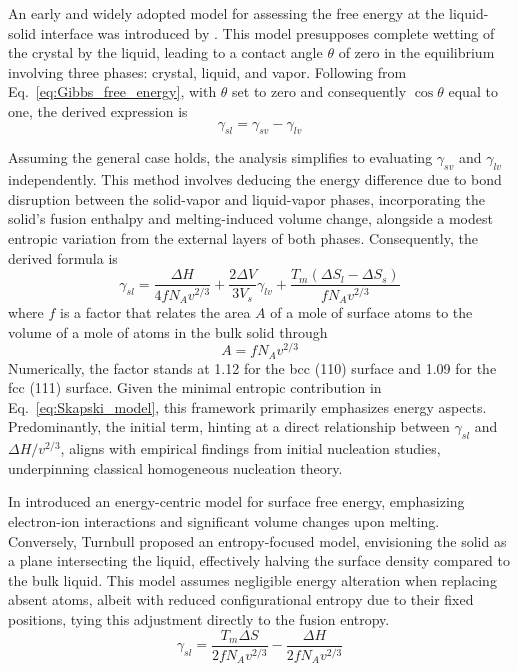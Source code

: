 An early and widely adopted model for assessing the free energy at the liquid-solid interface was introduced by \cite{Skapski1956ATO}. This model 
presupposes complete wetting of the crystal by the liquid, leading to a contact angle $\theta$ of zero in the equilibrium involving three phases: 
crystal, liquid, and vapor. Following from Eq.~\ref{eq:Gibbs_free_energy}, with $\theta$ set to zero and consequently $\cos \theta$ equal to one, the derived expression is
\begin{equation} \label{eq:Skapski_model}
\gamma_{sl} = \gamma_{sv} - \gamma_{lv}
\end{equation}

Assuming the general case holds, the analysis simplifies to evaluating $\gamma_{sv}$ and $\gamma_{lv}$ independently. This method involves deducing the 
energy difference due to bond disruption between the solid-vapor and liquid-vapor phases, incorporating the solid's fusion enthalpy and melting-induced volume 
change, alongside a modest entropic variation from the external layers of both phases. Consequently, the derived formula is
\begin{equation} \label{eq:Skapski_result}
\gamma_{sl} = \frac{\Delta H}{4f N_{A} v^{2/3}} + \frac{2\Delta V}{3V_{s}} \gamma_{lv} + \frac{T_m (\Delta S_l - \Delta S_s)}{f N_{A} v^{2/3}}
\end{equation}
where $f$ is a factor that relates the area $A$ of a mole of surface atoms to the volume of a mole of atoms in the bulk solid through
\begin{equation} \label{eq:relation_factor}
A = f N_{A} v^{2/3}
\end{equation}
Numerically, the factor stands at 1.12 for the bcc (110) surface and 1.09 for the fcc (111) surface. Given the 
minimal entropic contribution in Eq.~\ref{eq:Skapski_model}, this framework primarily emphasizes energy aspects. 
Predominantly, the initial term, hinting at a direct relationship between $\gamma_{sl}$ and $\Delta H/v^{2/3}$, 
aligns with empirical findings from initial nucleation studies, underpinning classical homogeneous nucleation theory.

In \cite{Zadumkin1966SurfaceEA} introduced an energy-centric model for surface free energy, emphasizing electron-ion interactions and 
significant volume changes upon melting. Conversely, Turnbull proposed an entropy-focused model, envisioning the solid as a plane 
intersecting the liquid, effectively halving the surface density compared to the bulk liquid. This model assumes negligible energy 
alteration when replacing absent atoms, albeit with reduced configurational entropy due to their fixed positions, tying this adjustment directly to the fusion entropy.
\begin{equation} \label{eq:Turnbull_model}
\gamma_{sl} = \frac{T_m \Delta S}{2f N_{A} v^{2/3}} - \frac{\Delta H}{2f N_{A} v^{2/3}}
\end{equation}

